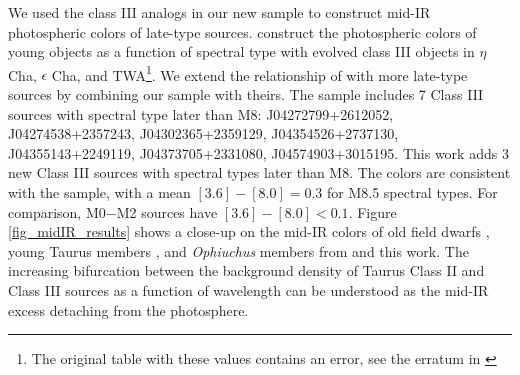 We used the class III analogs in our new sample to construct mid-IR photospheric colors of late-type sources.  \citet{2010ApJS..186..111L} construct the photospheric colors of young objects as a function of spectral type with evolved class III objects in $\eta$ Cha, $\epsilon$ Cha, and TWA\footnote{The original table with these values contains an error, see the erratum in \cite{2010ApJS..189..353L}}.  We extend the relationship of \citet{2010ApJS..186..111L} with more late-type sources by combining our sample with theirs.  The \citet{2010ApJS..189..353L} sample includes 7 Class III sources with spectral type later than M8: J04272799+2612052, J04274538+2357243, J04302365+2359129, J04354526+2737130, J04355143+2249119, J04373705+2331080, J04574903+3015195.  This work adds 3 new Class III sources with spectral types later than M8.  The colors are consistent with the \citet{2010ApJS..189..353L} sample, with a mean $[3.6]-[8.0]=0.3$ for M8.5 spectral types.  For comparison, M0$-$M2 sources have $[3.6]-[8.0]<0.1$.    Figure \ref{fig_midIR_results} shows a close-up on the mid-IR colors of old field dwarfs \citep{2006ApJ...651..502P}, young Taurus members \citep{2010ApJS..186..111L}, and \emph{Ophiuchus} members from \citep{allers06} and this work.  The increasing bifurcation between the background density of Taurus Class II and Class III sources as a function of wavelength can be understood as the mid-IR excess detaching from the photosphere.


